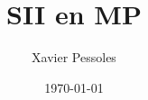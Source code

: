 \documentclass[
	fontsize=10pt, %
	twoside=true, %
]{kaobook}
\begin{document}

\titlehead{Document Template}
\title[SII en MP]{SII en MP}
\author[XP]{Xavier Pessoles}
\date{\today}

%
\frontmatter %
%
%
%
%	
%	
%	
%	
%	
%	
%	
%
%
%
\end{document}
